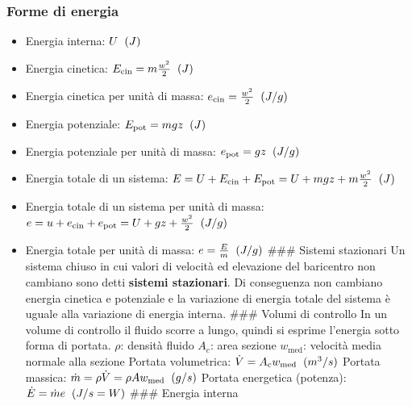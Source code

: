 \hypertarget{forme-di-energia}{%
\subsubsection{Forme di energia}\label{forme-di-energia}}

\begin{itemize}
\tightlist
\item
  Energia interna: \(U \hspace{0.2cm}(J)\)
\item
  Energia cinetica: \(E_\text{cin}=m\frac{w^2}{2}\hspace{0.2cm}(J)\)
\item
  Energia cinetica per unità di massa:
  \(e_\text{cin}=\frac{w^2}{2}\hspace{0.2cm}(J/g)\)
\item
  Energia potenziale: \(E_\text{pot}=mgz\hspace{0.2cm}(J)\)
\item
  Energia potenziale per unità di massa:
  \(e_\text{pot}=gz\hspace{0.2cm}(J/g)\)
\item
  Energia totale di un sistema:
  \(E=U+E_\text{cin}+E_\text{pot}=U+mgz+m\frac{w^2}{2}\hspace{0.2cm}(J)\)
\item
  Energia totale di un sistema per unità di massa:
  \(e=u+e_\text{cin}+e_\text{pot}=U+gz+\frac{w^2}{2}\hspace{0.2cm}(J/g)\)
\item
  Energia totale per unità di massa:
  \(e=\frac{E}{m}\hspace{0.2cm}(J/g)\) \#\#\# Sistemi stazionari Un
  sistema chiuso in cui valori di velocità ed elevazione del baricentro
  non cambiano sono detti \textbf{sistemi stazionari}. Di conseguenza
  non cambiano energia cinetica e potenziale e la variazione di energia
  totale del sistema è uguale alla variazione di energia interna. \#\#\#
  Volumi di controllo In un volume di controllo il fluido scorre a
  lungo, quindi si esprime l'energia sotto forma di portata. \(\rho\):
  densità fluido \(A_c\): area sezione \(w_\text{med}\): velocità media
  normale alla sezione Portata volumetrica:
  \(\dot V=A_cw_\text{med}\hspace{0.2cm}(m^3/s)\) Portata massica:
  \(\dot m=\rho \dot V=\rho Aw_\text{med}\hspace{0.2cm}(g/s)\) Portata
  energetica (potenza): \(\dot E=\dot me\hspace{0.2cm}(J/s=W)\) \#\#\#
  Energia interna

\end{itemize}
